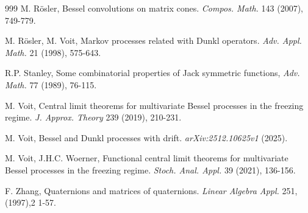 \documentclass[reqno]{amsart}
\theoremstyle{plain}
\theoremstyle{definition}
\numberwithin{equation}{section}
\begin{document}
\begin{thebibliography}{999}
  M. R\"osler,
 Bessel convolutions on matrix cones.
 \textit{ Compos. Math.} 143 (2007), 749-779.

  M. R\"osler, M. Voit, Markov processes related with Dunkl operators.
   \textit{Adv. Appl. Math.}  21 (1998), 575-643.

 R.P. Stanley, Some combinatorial properties of Jack symmetric functions,\textit{ Adv. Math.} 77 (1989), 76-115.

    M. Voit, Central limit theorems 
  for multivariate Bessel processes in the freezing regime.\textit{ J. Approx. Theory } 239 (2019), 210-231.

 M. Voit, 
Bessel and Dunkl processes with drift.
\textit{arXiv:2512.10625v1} (2025).

 M. Voit, J.H.C. Woerner, Functional 
 central limit theorems for multivariate Bessel processes in the
 freezing regime. \textit{ Stoch. Anal. Appl.} 39 (2021), 136-156. 

 F. Zhang, Quaternions and matrices of quaternions.  \textit{ Linear Algebra Appl.}
  251, (1997),2 1-57.

\end{thebibliography}

        
\end{document}
